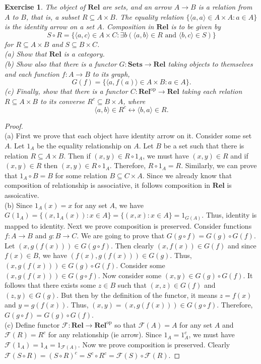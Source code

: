 \documentclass[a4paper, 11pt]{book}
\theoremstyle{plain}
\newtheorem{exercise}{Exercise}[chapter]
\theoremstyle{plain}
\newcommand{\mb}{\mathbf}
\newcommand{\arr}{\rightarrow}
\newcommand{\op}{\text{op}}
\newcommand{\mc}{\mathcal}
\newcommand{\F}{\mc{F}}
\begin{document}
  \begin{exercise}
    The object of $\mb{Rel}$ are sets, and an arrow $A \arr B$ is a relation from $A$ to $B$, that is, a subset $R \subseteq A \times B$. The equality relation $\{ \langle a, a \rangle \in A \times A: a \in A \}$ is the identity arrow on a set $A$. Composition in $\mb{Rel}$ is to be given by $$ S \circ R=\{ \langle a , c \rangle \in A \times C: \exists b (\langle a,b \rangle \in R \text{ and } \langle b,c \rangle \in S)\}$$ for $R \subseteq A \times B$ and $S \subseteq B \times C$. \\
    (a) Show that $\mb{Rel}$ is a category. \\
    (b) Show also that there is a functor $G: \mb{Sets} \arr \mb{Rel}$ taking objects to themselves and each function $f:A \arr B$ to its graph, $$G(f)=\{ \langle a, f(a) \rangle \in A \times B: a \in A\}.$$ 
    (c) Finally, show that there is a functor $C:\mb{Rel}^\op \rightarrow \mb{Rel}$ taking each relation $R \subseteq A \times B$ to its converse $R^c \subseteq B \times A$, where $$\langle a,b \rangle \in R^c \leftrightarrow \langle b,a \rangle \in R.$$
  \end{exercise}
  \begin{proof} $ $ \\
    (a) First we prove that each object have identity arrow on it. Consider some set $A$. Let $1_A$ be the equality relationship on $A$. Let $B$ be a set such that there is relation $R \subseteq A \times B$. Then if $(x,y) \in R \circ 1_A$, we must have $(x,y) \in R$ and if $(x,y) \in R$ then $(x,y) \in R \circ 1_A$. Therefore, $R \circ 1_A=R$. Similarly, we can prove that $1_A \circ B=B$ for some relation $B \subseteq C \times A$. Since we already know that composition of relationship is associative, it follows composition in $\mb{Rel}$ is assoicative. \\

    (b) Since $1_A(x)=x$ for any set $A$, we have $G(1_A)=\{(x, 1_A(x)): x \in A\}=\{(x,x):x \in A\}=1_{G(A)}$. Thus, identity is mapped to identity. Next we prove composition is preserved. Consider functions $f:A \arr B$ and $g:B \arr C$. We are going to prove that $G(g \circ f)=G(g) \circ G(f)$. Let $(x, g(f(x))) \in G(g \circ f)$. Then clearly $(x, f(x)) \in G(f)$ and since $f(x) \in B$, we have $(f(x), g(f(x))) \in G(g)$. Thus, $(x, g(f(x))) \in G(g) \circ G(f)$. Consider some $(x,g(f(x))) \in G(g \circ f)$. Now consider some $(x,y) \in G(g) \circ G(f)$. It follows that there exists some $z \in B$ such that $(x,z) \in G(f)$ and $(z,y) \in G(g)$. But then by the definition of the functor, it means $z=f(x)$ and $y=g(f(x))$. Thus, $(x,y)=(x,g(f(x))) \in G(g \circ f)$. Therefore, $G(g \circ f)=G(g) \circ G(f)$. \\

    (c) Define functor $\mc{F}: \mb{Rel} \arr \mb{Rel}^\op$ so that $\mc{F}(A)=A$ for any set $A$ and $\mc{F}(R)=R^c$ for any relationship (ie arrow). Since $1_A=1_A^c$, we must have $\mc{F}(1_A)=1_A=1_{\mc{F}(A)}$. Now we prove composition is preserved. Clearly $\mc{F}(S \circ R)=(S \circ R)^c = S^c \circ R^c = \F(S) \circ \F(R)$.
  \end{proof}
\end{document}
